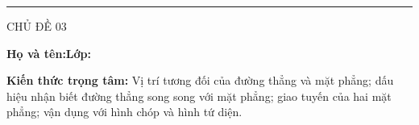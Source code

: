 \documentclass[11pt,a4paper]{article}
\newcommand{\sectitle}[2]{\vspace{3pt}\noindent{\large\bfseries\textcolor{questionpurple}{#1.\ #2}}\par\vspace{2pt}}
\begin{document}
\noindent
\begin{minipage}[t]{.35\linewidth}
  \vspace{2pt}\rule{.73\linewidth}{.4pt}\par\vspace{2pt}
  CHỦ ĐỀ 03\par\vspace{2pt}{\itshape TÀI LIỆU HỌC TẬP -- BÀI 08.1\par}
\end{minipage}\hfill
\begin{minipage}[t]{.62\linewidth}
  \vspace{4pt}{\small\bfseries VẤN ĐỀ 11X33\par
  ĐƯỜNG THẲNG VÀ MẶT PHẲNG SONG SONG\par}
\end{minipage}

\vspace{3mm}
\noindent\textbf{Họ và tên:}\dotfill\hfill\textbf{Lớp:}\enspace\dotfill
\vspace{1mm}

\begin{theorybox}
\textbf{Kiến thức trọng tâm:} Vị trí tương đối của đường thẳng và mặt phẳng;
dấu hiệu nhận biết đường thẳng song song với mặt phẳng; giao tuyến của
hai mặt phẳng; vận dụng với hình chóp và hình tứ diện.
\end{theorybox}

\sectitle{1}{Đường thẳng song song với mặt phẳng}
\end{document}
